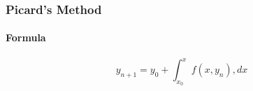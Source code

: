 \subsubsection{Picard's Method}

\paragraph{Formula}
\[y_{n + 1} = y_0 + \int_{x_0}^{x} f(x, y_n), dx \]